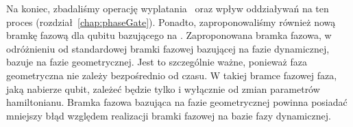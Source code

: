 Na koniec, zbadaliśmy operację wyplatania \MZM\ oraz wpływ oddziaływań na ten proces (rozdział~\ref{chap:phaseGate}).
Ponadto, zaproponowaliśmy również nową bramkę fazową dla qubitu bazującego na \MZM.
Zaproponowana bramka fazowa, w odróżnieniu od standardowej bramki fazowej bazującej na fazie dynamicznej, bazuje na fazie geometrycznej.
Jest to szczególnie ważne, ponieważ faza geometryczna nie zależy bezpośrednio od czasu. 
W takiej bramce fazowej faza, jaką nabierze qubit, zależeć będzie tylko i wyłącznie od zmian parametrów hamiltonianu.
Bramka fazowa bazująca na fazie geometrycznej powinna posiadać mniejszy błąd względem realizacji bramki fazowej na bazie fazy dynamicznej.

\ornament
